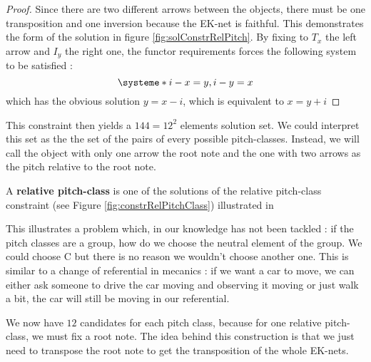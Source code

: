\begin{proof}
    Since there are two different arrows between the objects, there must be one transposition and one inversion because the EK-net is faithful. This demonstrates the form of the solution in figure \ref{fig:solConstrRelPitch}. By fixing to $T_x$ the left arrow and $I_y$ the right one, the functor requirements forces the following system to be satisfied :
    $$\systeme*{i-x = y,i-y = x }$$
    which has the obvious solution $y = x - i$, which is equivalent to $x = y + i$

\end{proof}

This constraint then yields a $144 = 12^2$ elements solution set. We could interpret this set as the the set of the pairs of every possible pitch-classes. Instead, we will call the object with only one arrow the root note and the one with two arrows as the pitch relative to the root note.

\begin{defn}
    A \textbf{relative pitch-class} is one of the solutions of the relative pitch-class constraint (see Figure \ref{fig:constrRelPitchClass}) illustrated in
\end{defn}




This illustrates a problem which, in our knowledge has not been tackled : if the pitch classes are a group, how do we choose the neutral element of the group. We could choose C but there is no reason we wouldn't choose another one.
This is similar to a change of referential in mecanics : if we want a car to move, we can either ask someone to drive the car moving and observing it moving or just walk a bit, the car will still be moving in our referential.





We now have $12$ candidates for each pitch class, because for one relative pitch-class, we must fix a root note. The idea behind this construction is that we just need to transpose the root note to get the transposition of the whole EK-nets.

